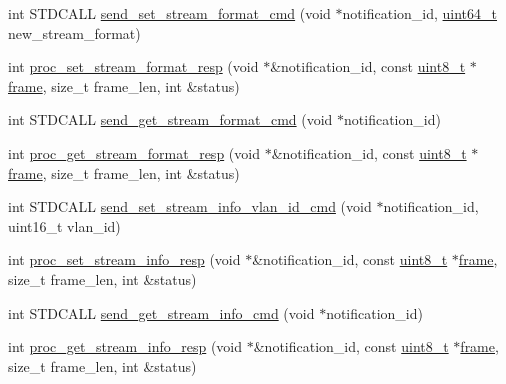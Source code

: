 \begin{DoxyCompactItemize}
\item 
int S\+T\+D\+C\+A\+LL \hyperlink{classavdecc__lib_1_1stream__output__descriptor__imp_ad5c08ba242703c9d0f6cab2b08d6aad6}{send\+\_\+set\+\_\+stream\+\_\+format\+\_\+cmd} (void $\ast$notification\+\_\+id, \hyperlink{parse_8c_aec6fcb673ff035718c238c8c9d544c47}{uint64\+\_\+t} new\+\_\+stream\+\_\+format)
\item 
int \hyperlink{classavdecc__lib_1_1stream__output__descriptor__imp_af496c7db35b10428eb3587c7f460297a}{proc\+\_\+set\+\_\+stream\+\_\+format\+\_\+resp} (void $\ast$\&notification\+\_\+id, const \hyperlink{stdint_8h_aba7bc1797add20fe3efdf37ced1182c5}{uint8\+\_\+t} $\ast$\hyperlink{gst__avb__playbin_8c_ac8e710e0b5e994c0545d75d69868c6f0}{frame}, size\+\_\+t frame\+\_\+len, int \&status)
\item 
int S\+T\+D\+C\+A\+LL \hyperlink{classavdecc__lib_1_1stream__output__descriptor__imp_a55d62cc35400a8d57aefbcfbea84acb9}{send\+\_\+get\+\_\+stream\+\_\+format\+\_\+cmd} (void $\ast$notification\+\_\+id)
\item 
int \hyperlink{classavdecc__lib_1_1stream__output__descriptor__imp_a14f4051747c7470766410b64a8dfef84}{proc\+\_\+get\+\_\+stream\+\_\+format\+\_\+resp} (void $\ast$\&notification\+\_\+id, const \hyperlink{stdint_8h_aba7bc1797add20fe3efdf37ced1182c5}{uint8\+\_\+t} $\ast$\hyperlink{gst__avb__playbin_8c_ac8e710e0b5e994c0545d75d69868c6f0}{frame}, size\+\_\+t frame\+\_\+len, int \&status)
\item 
int S\+T\+D\+C\+A\+LL \hyperlink{classavdecc__lib_1_1stream__output__descriptor__imp_a40e45c9b721eec47624ad9229427f5d0}{send\+\_\+set\+\_\+stream\+\_\+info\+\_\+vlan\+\_\+id\+\_\+cmd} (void $\ast$notification\+\_\+id, uint16\+\_\+t vlan\+\_\+id)
\item 
int \hyperlink{classavdecc__lib_1_1stream__output__descriptor__imp_a37df54e12713796100b4751fa479395d}{proc\+\_\+set\+\_\+stream\+\_\+info\+\_\+resp} (void $\ast$\&notification\+\_\+id, const \hyperlink{stdint_8h_aba7bc1797add20fe3efdf37ced1182c5}{uint8\+\_\+t} $\ast$\hyperlink{gst__avb__playbin_8c_ac8e710e0b5e994c0545d75d69868c6f0}{frame}, size\+\_\+t frame\+\_\+len, int \&status)
\item 
int S\+T\+D\+C\+A\+LL \hyperlink{classavdecc__lib_1_1stream__output__descriptor__imp_a28e797d4aac97c6e6c31e79ce8a1a4e6}{send\+\_\+get\+\_\+stream\+\_\+info\+\_\+cmd} (void $\ast$notification\+\_\+id)
\item 
int \hyperlink{classavdecc__lib_1_1stream__output__descriptor__imp_a7295ef0aaf778e1d94aa5b8150104a3e}{proc\+\_\+get\+\_\+stream\+\_\+info\+\_\+resp} (void $\ast$\&notification\+\_\+id, const \hyperlink{stdint_8h_aba7bc1797add20fe3efdf37ced1182c5}{uint8\+\_\+t} $\ast$\hyperlink{gst__avb__playbin_8c_ac8e710e0b5e994c0545d75d69868c6f0}{frame}, size\+\_\+t frame\+\_\+len, int \&status)

\end{DoxyCompactItemize}
